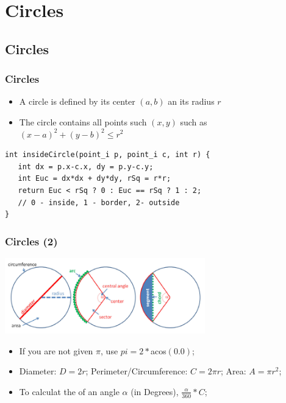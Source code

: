 \documentclass{beamer}
\begin{document}
\section{Circles}
\subsection{Circles}
\begin{frame}
  \frametitle{Circles}
  {\smaller
  \begin{itemize}
  \item A circle is defined by its center $(a,b)$ an its radius $r$
  \item The circle contains all points such $(x,y)$ such as $(x-a)^2+(y-b)^2 \leq r^2$
  \end{itemize}

  \begin{exampleblock}{}
\begin{verbatim}
int insideCircle(point_i p, point_i c, int r) {
   int dx = p.x-c.x, dy = p.y-c.y;
   int Euc = dx*dx + dy*dy, rSq = r*r;
   return Euc < rSq ? 0 : Euc == rSq ? 1 : 2; 
   // 0 - inside, 1 - border, 2- outside
}
\end{verbatim}
  \end{exampleblock}
  }
\end{frame}


\begin{frame}
  \frametitle{Circles (2)}
  {\smaller

    \begin{center}
      \includegraphics[width=0.65\textwidth]{../img/circle_halim}
    \end{center}

    \begin{itemize}
      \item If you are not given $\pi$, use $pi = 2*$acos$(0.0)$;
      \item Diameter: $D=2r$; Perimeter/Circumference: $C=2\pi r$; Area: $A=\pi r^2$;
      \item To calculat the  of an angle $\alpha$ (in Degrees), $\frac{\alpha}{360}*C$;
    \end{itemize}
  }
\end{frame}
\end{document}
